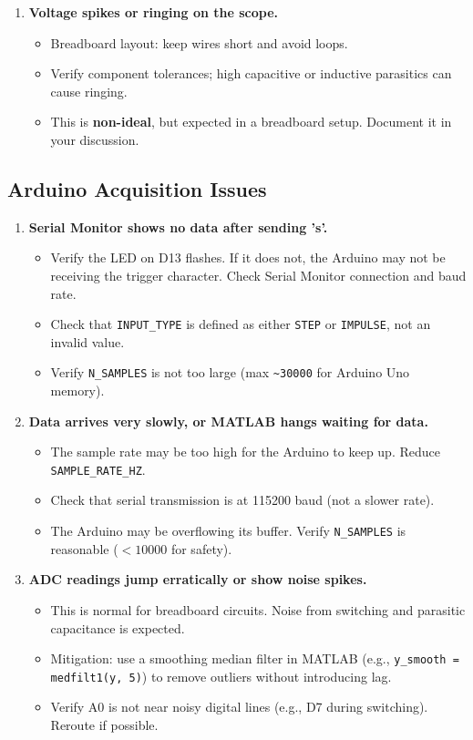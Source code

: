 \documentclass[11pt,letterpaper]{article}
\begin{document}
\begin{enumerate}
    \item \textbf{Voltage spikes or ringing on the scope.}
    \begin{itemize}
        \item Breadboard layout: keep wires short and avoid loops.
        \item Verify component tolerances; high capacitive or inductive parasitics can cause ringing.
        \item This is \textbf{non-ideal}, but expected in a breadboard setup. Document it in your discussion.
    \end{itemize}
\end{enumerate}

\subsection*{Arduino Acquisition Issues}

\begin{enumerate}
    \item \textbf{Serial Monitor shows no data after sending 's'.}
    \begin{itemize}
        \item Verify the LED on D13 flashes. If it does not, the Arduino may not be receiving the trigger character. Check Serial Monitor connection and baud rate.
        \item Check that \texttt{INPUT\_TYPE} is defined as either \texttt{STEP} or \texttt{IMPULSE}, not an invalid value.
        \item Verify \texttt{N\_SAMPLES} is not too large (max \texttt{\textasciitilde 30000} for Arduino Uno memory).
    \end{itemize}

    \item \textbf{Data arrives very slowly, or MATLAB hangs waiting for data.}
    \begin{itemize}
        \item The sample rate may be too high for the Arduino to keep up. Reduce \texttt{SAMPLE\_RATE\_HZ}.
        \item Check that serial transmission is at 115200 baud (not a slower rate).
        \item The Arduino may be overflowing its buffer. Verify \texttt{N\_SAMPLES} is reasonable ($<10000$ for safety).
    \end{itemize}

    \item \textbf{ADC readings jump erratically or show noise spikes.}
    \begin{itemize}
        \item This is normal for breadboard circuits. Noise from switching and parasitic capacitance is expected.
        \item Mitigation: use a smoothing median filter in MATLAB (e.g., \texttt{y\_smooth = medfilt1(y, 5)}) to remove outliers without introducing lag.
        \item Verify A0 is not near noisy digital lines (e.g., D7 during switching). Reroute if possible.
    \end{itemize}
\end{enumerate}
\end{document}
